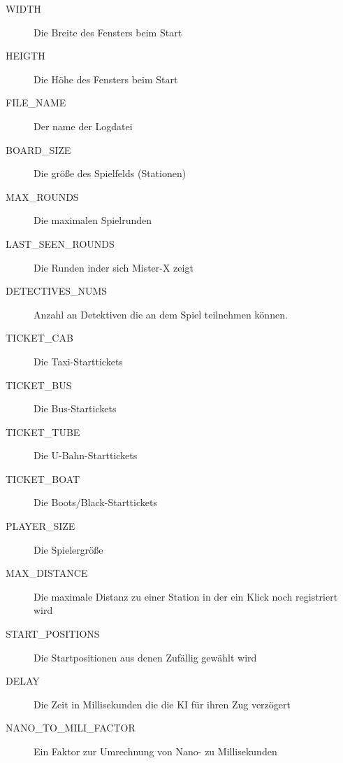                 \begin{description}
                    \item[WIDTH] Die Breite des Fensters beim Start
                    \item[HEIGTH] Die Höhe des Fensters beim Start
                    \item[FILE\_NAME] Der name der Logdatei 
                    \item[BOARD\_SIZE] Die größe des Spielfelds (Stationen)
                    \item[MAX\_ROUNDS] Die maximalen Spielrunden
                    \item[LAST\_SEEN\_ROUNDS] Die Runden inder sich Mister-X zeigt
                    \item[DETECTIVES\_NUMS] Anzahl an Detektiven die an dem Spiel teilnehmen können.
                    \item[TICKET\_CAB] Die Taxi-Starttickets
                    \item[TICKET\_BUS] Die Bus-Startickets
                    \item[TICKET\_TUBE] Die U-Bahn-Starttickets
                    \item[TICKET\_BOAT] Die Boots/Black-Starttickets
                    \item[PLAYER\_SIZE] Die Spielergröße 
                    \item[MAX\_DISTANCE] Die maximale Distanz zu einer Station in der ein Klick noch registriert wird
                    \item[START\_POSITIONS] Die Startpositionen aus denen Zufällig gewählt wird
                    \item[DELAY] Die Zeit in Millisekunden die die KI für ihren Zug verzögert
                    \item[NANO\_TO\_MILI\_FACTOR] Ein Faktor zur Umrechnung von Nano- zu Millisekunden 
                \end{description}


